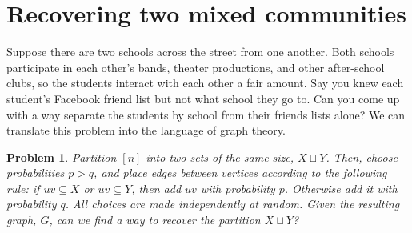 \documentclass[11pt,letterpaper]{article}
\newtheorem{problem}{Problem}
\begin{document}
\section{Recovering two mixed communities}

Suppose there are two schools across the street from one another. Both schools participate in each other's bands, theater productions, and other after-school clubs, so the students interact with each other a fair amount. Say you knew each student's Facebook friend list but not what school they go to. Can you come up with a way separate the students by school from their friends lists alone? We can translate this problem into the language of graph theory.

\begin{problem}
	Partition $[n]$ into two sets of the same size, $X\sqcup Y$. Then, choose probabilities $p>q$, and place edges between vertices according to the following rule: if $uv\subseteq X$ or $uv\subseteq Y$, then add $uv$ with probability $p$. Otherwise add it with probability $q$. All choices are made independently at random. Given the resulting graph, $G$, can we find a way to recover the partition $X\sqcup Y$?
\end{problem}
\end{document}
